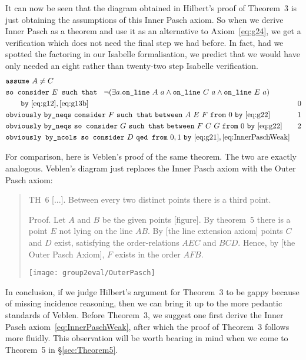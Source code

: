 It can now be seen that the diagram obtained in Hilbert's proof of Theorem~3 is just obtaining the assumptions of this Inner Pasch axiom. So when we derive Inner Pasch as a theorem and use it as an alternative to Axiom~\ref{eq:g24}, we get a verification which does not need the final step we had before. In fact, had we spotted the factoring in our Isabelle formalisation, we predict that we would have only needed an eight rather than twenty-two step Isabelle verification.
\begin{align*}
&\code{assume}\ A\neq C\\
&\code{so consider}\ E \code{ such that }\ \Triangle{a}{A}{C}{E}\\
&\qquad\code{by}\ \eqref{eq:g12},\eqref{eq:g13b}& 0\\
&\code{obviously}\ \code{by\_neqs}\ \code{consider}\ F\ \code{such that}\ \between{A}{E}{F}\ \code{from}\ 0\ \code{by}\ \eqref{eq:g22} & 1\\
&\code{obviously}\ \code{by\_neqs}\ \code{so consider}\ G\ \code{such that}\ \between{F}{C}{G}\ \code{from}\ 0\ \code{by}\ \eqref{eq:g22} & 2\\
&\code{obviously by\_ncols so consider}\ D\ \code{qed from}\ 0,1\ \code{by}\ \eqref{eq:g21},\eqref{eq:InnerPaschWeak}
\end{align*}

For comparison, here is Veblen's proof of the same theorem. The two are exactly analogous. Veblen's diagram just replaces the Inner Pasch axiom with the Outer Pasch axiom:
\begin{quotation}\label{sec:VeblenThree}
TH~6 [...]. Between every two distinct points there is a third point.

Proof. Let $A$ and $B$ be the given points [figure]. By theorem~5 there is a point $E$ not lying on the line $AB$. By [the line extension axiom] points $C$ and $D$ exist, satisfying the order-relations $AEC$ and $BCD$. Hence, by [the Outer Pasch Axiom], $F$ exists in the order $AFB$.

\centering\texttt{[image: group2eval/OuterPasch]}
\end{quotation}
In conclusion, if we judge Hilbert's argument for Theorem~3 to be gappy because of missing incidence reasoning, then we can bring it up to the more pedantic standards of Veblen. Before Theorem~3, we suggest one first derive the Inner Pasch axiom~\eqref{eq:InnerPaschWeak}, after which the proof of Theorem~3 follows more fluidly. This observation will be worth bearing in mind when we come to Theorem~5 in \S\ref{sec:Theorem5}.

